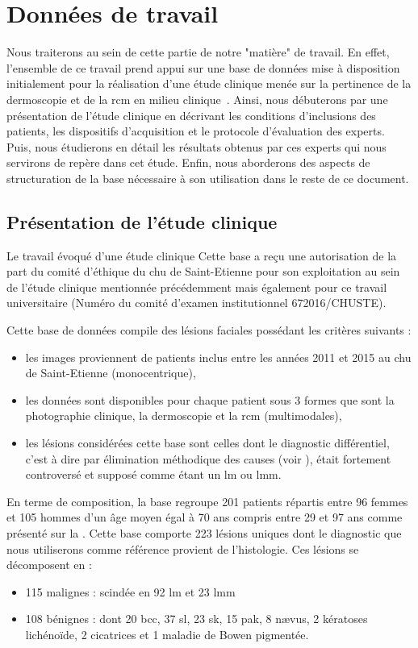\section{Données de travail}
Nous traiterons au sein de cette partie de notre "matière" de travail. En effet, l'ensemble de ce travail prend appui sur une base de données mise à disposition initialement pour la réalisation d'une étude clinique menée sur la pertinence de la dermoscopie et de la \gls{rcm} en milieu clinique~\cite{Cinotti2018}. Ainsi, nous débuterons par une présentation de l'étude clinique en décrivant les conditions d'inclusions des patients, les dispositifs d'acquisition et le protocole d'évaluation des experts. Puis, nous étudierons en détail les résultats obtenus par ces experts qui nous servirons de repère dans cet étude. Enfin, nous aborderons des aspects de structuration de la base nécessaire à son utilisation dans le reste de ce document.\par

\subsection{Présentation de l'étude clinique}
Le travail évoqué  d'une étude clinique 
Cette base a reçu une autorisation de la part du comité d'éthique du \gls{chu} de Saint-Etienne pour son exploitation au sein de l'étude clinique mentionnée précédemment mais également pour ce travail universitaire (Numéro du comité d'examen institutionnel 672016/CHUSTE).\par

Cette base de données compile des lésions faciales possédant les critères suivants :
\begin{itemize}
\item les images proviennent de patients inclus entre les années 2011 et 2015 au \gls{chu} de Saint-Etienne (monocentrique),
\item les données sont disponibles pour chaque patient sous 3 formes que sont la photographie clinique, la dermoscopie et la \gls{rcm} (multimodales),
\item les lésions considérées cette base sont celles dont le diagnostic différentiel, c'est à dire par élimination méthodique des causes (voir
), était fortement controversé et supposé comme étant un \gls{lm} ou \gls{lmm}.
\end{itemize}\par

En terme de composition, la base regroupe 201 patients répartis entre 96 femmes et 105 hommes d'un âge moyen égal à 70 ans compris entre 29 et 97 ans comme présenté sur la . Cette base comporte 223 lésions uniques dont le diagnostic que nous utiliserons comme référence provient de l'histologie. Ces lésions se décomposent en :
\begin{itemize}
\item 115 malignes : scindée en 92 \gls{lm} et 23 \gls{lmm}
\item 108 bénignes : dont 20 \gls{bcc}, 37 \gls{sl}, 23 \gls{sk}, 15 \gls{pak}, 8 nævus, 2 kératoses lichénoïde, 2 cicatrices et 1 maladie de Bowen pigmentée.
\end{itemize}\par

